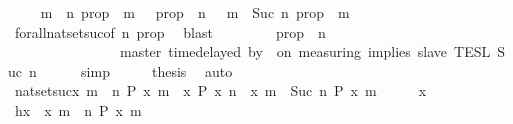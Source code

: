 \begin{isabellebody}
\ \ \isamarkupfalse%
\ {\isacartoucheopen}{\isacharbraceleft}{\isasymrho}{\isachardot}\ {\isasymforall}m\ {\isasymge}\ n{\isachardot}\ {\isacharquery}prop\ {\isasymrho}\ m{\isacharbraceright}\ {\isacharequal}\ {\isacharbraceleft}{\isasymrho}{\isachardot}\ {\isacharquery}prop\ {\isasymrho}\ n{\isacharbraceright}\ {\isasyminter}\ {\isacharbraceleft}{\isasymrho}{\isachardot}\ {\isasymforall}m\ {\isasymge}\ Suc\ n{\isachardot}\ {\isacharquery}prop\ {\isasymrho}\ m{\isacharbraceright}{\isacartoucheclose}\isanewline
\ \ \ \ \isamarkupfalse%
\ forall{\isacharunderscore}nat{\isacharunderscore}set{\isacharunderscore}suc{\isacharbrackleft}of\ {\isacartoucheopen}n{\isacartoucheclose}\ {\isacharquery}prop{\isacharbrackright}\ \isamarkupfalse%
\ blast\isanewline
\ \ \isamarkupfalse%
\ \isamarkupfalse%
\ {\isacartoucheopen}{\isachardot}{\isachardot}{\isachardot}\ {\isacharequal}\ {\isacharbraceleft}{\isasymrho}{\isachardot}\ {\isacharquery}prop\ {\isasymrho}\ n{\isacharbraceright}\isanewline
\ \ \ \ \ \ \ \ \ \ \ \ \ \ {\isasyminter}\ {\isasymlbrakk}\ master\ time{\isacharminus}delayed\ by\ {\isasymdelta}{\isasymtau}\ on\ measuring\ implies\ slave\ {\isasymrbrakk}\isactrlsub T\isactrlsub E\isactrlsub S\isactrlsub L\isactrlbsup {\isasymge}\ Suc\ n\isactrlesup {\isacartoucheclose}\isanewline
\ \ \ \ \isamarkupfalse%
\ simp\isanewline
\ \ \isamarkupfalse%
\ \isamarkupfalse%
\ {\isacharquery}thesis\ \isamarkupfalse%
\ auto\isanewline
{}\isamarkupfalse%
%
\endisatagproof
{\isafoldproof}%
%
\isadelimproof
\isanewline
%
\endisadelimproof
\isanewline
{}\isamarkupfalse%
\ nat{\isacharunderscore}set{\isacharunderscore}suc{\isacharcolon}{\isacartoucheopen}{\isacharbraceleft}x{\isachardot}\ {\isasymforall}m\ {\isasymge}\ n{\isachardot}\ P\ x\ m{\isacharbraceright}\ {\isacharequal}\ {\isacharbraceleft}x{\isachardot}\ P\ x\ n{\isacharbraceright}\ {\isasyminter}\ {\isacharbraceleft}x{\isachardot}\ {\isasymforall}m\ {\isasymge}\ Suc\ n{\isachardot}\ P\ x\ m{\isacharbraceright}{\isacartoucheclose}\isanewline
%
\isadelimproof
%
\endisadelimproof
%
\isatagproof
{}\isamarkupfalse%
\isanewline
\ \ \isacommand{{\isacharbraceleft}}\isamarkupfalse%
\ \isamarkupfalse%
\ x\isanewline
\ \ \ \ \isamarkupfalse%
\ h{\isacharcolon}{\isacartoucheopen}x\ {\isasymin}\ {\isacharbraceleft}x{\isachardot}\ {\isasymforall}m\ {\isasymge}\ n{\isachardot}\ P\ x\ m{\isacharbraceright}{\isacartoucheclose}\isanewline

\end{isabellebody}
